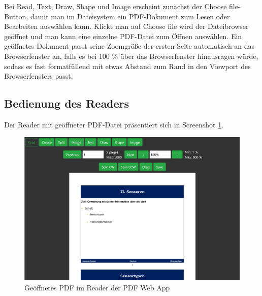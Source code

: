 Bei Read, Text, Draw, Shape und Image erscheint zunächst der Choose file-Button, damit man im Dateisystem ein PDF-Dokument zum Lesen oder Bearbeiten auswählen kann. Klickt man auf Choose file wird der Dateibrowser geöffnet und man kann eine einzelne PDF-Datei zum Öffnen auswählen. Ein geöffnetes Dokument passt seine Zoomgröße der ersten Seite automatisch an das Browserfenster an, falls es bei 100 \% über das Browserfenster hinausragen würde, sodass es fast formatfüllend mit etwas Abstand zum Rand in den Viewport des Browserfensters passt. 

\subsection{Bedienung des Readers}
Der Reader mit geöffneter PDF-Datei präsentiert sich in Screenshot \ref{fig:reader}.

\begin{figure}[!htbp]
	\centering
	\includegraphics[width=1\textwidth]{"images/reader.png"}
	\caption{Geöffnetes PDF im Reader der PDF Web App}
	\label{fig:reader}
\end{figure}

